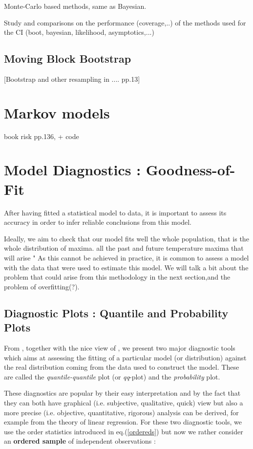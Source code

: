 \documentclass[11pt,a4paper,openany ]{book}
\begin{document}
Monte-Carlo based methods, same as Bayesian.

Study and comparisons on the performance (coverage,..) of the methods used for the CI (boot, bayesian, likelihood, asymptotics,...)
\subsection{Moving Block Bootstrap}

[Bootstrap and other resampling in .... pp.13]


\section{Markov models}
book risk pp.136, \cite{shaby_markov-switching_2016} + code




\section{Model Diagnostics : Goodness-of-Fit}

After having fitted a statistical model to data, it is important to assess its accuracy in order to infer reliable conclusions from this model.

Ideally, we aim to check that our model fits well the whole population, that is the whole distribution of maxima. all the past and future temperature maxima that will arise " As this cannot be achieved in practice, it is common to assess a model with the data that were used to estimate this model. We will talk a bit about the problem that could arise from this methodology in the next section,and the problem of overfitting(?).



\subsection{Diagnostic Plots : Quantile and Probability Plots}
From \cite[pp.18-36]{beirlant_practical_1996}, together with the nice view of \cite[pp.36-37]{coles_introduction_2001}, we present two major diagnostic tools which aims at assessing the fitting of a particular model (or distribution) against the real distribution coming from the data used to construct the model.
These are called the \emph{quantile-quantile} plot (or \emph{qq}-plot) and the \emph{probability} plot. 

These diagnostics are popular by their easy interpretation and by the fact that they can both have graphical (i.e. subjective, qualitative, quick) view but also a more precise (i.e. objective, quantitative, rigorous) analysis can be derived, for example from the theory of linear regression. 
\newline
For these two diagnostic tools, we use the order statistics introduced in eq.(\ref{ordereds}) but now we rather consider an \textbf{ordered sample} of independent observations :
\end{document}
